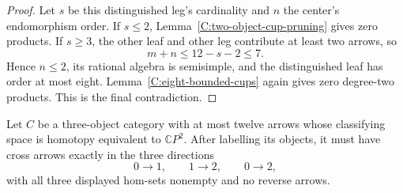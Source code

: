 \begin{proof}
Let $s$ be this distinguished leg's cardinality and $n$ the
center's endomorphism order. If $s\leq2$,
Lemma~\ref{C:two-object-cup-pruning} gives zero products.
If $s\geq3$, the other leaf and other leg contribute at least
two arrows, so
\[
 m+n\leq12-s-2\leq7.
\]
Hence $n\leq2$, its rational algebra is semisimple, and the
distinguished leaf has order at most eight.
Lemma~\ref{C:eight-bounded-cups} again gives zero degree-two
products. This is the final contradiction.
\end{proof}

\begin{proposition}
\label{C:twelve-three-condensation}
Let $C$ be a three-object category with at most twelve arrows
whose classifying space is homotopy equivalent to $\mathbb CP^2$.
After labelling its objects, it must have cross arrows exactly
in the three directions
\[
 0\longrightarrow1,\qquad1\longrightarrow2,\qquad0\longrightarrow2,
\]
with all three displayed hom-sets nonempty and no reverse arrows.
\end{proposition}
